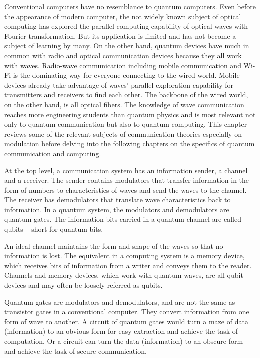 \documentclass{book}
\begin{document}
Conventional computers have no resemblance to quantum computers. Even before the appearance of modern computer, the not widely known subject of optical computing has explored the parallel computing capability of optical waves with Fourier transformation. But its application is limited and has not become a subject of learning by many. On the other hand, quantum devices have much in common with radio and optical communication devices because they all work with waves. Radio-wave communication including mobile communication and Wi-Fi is the dominating way for everyone connecting to the wired world. Mobile devices already take advantage of waves' parallel exploration capability for transmitters and receivers to find each other. The backbone of the wired world, on the other hand, is all optical fibers. The knowledge of wave communication reaches more engineering students than quantum physics and is most relevant not only to quantum communication but also to quantum computing. This chapter reviews some of the relevant subjects of communication theories especially on modulation before delving into the following chapters on the specifics of quantum communication and computing.

At the top level, a communication system has an information sender, a channel and a receiver. The sender contains modulators that transfer information in the form of numbers to characteristics of waves and send the waves to the channel. The receiver has demodulators that translate wave characteristics back to information. In a quantum system, the modulators and demodulators are quantum gates. The information bits carried in a quantum channel are called qubits -- short for quantum bits.

An ideal channel maintains the form and shape of the waves so that no information is lost. The equivalent in a computing system is a memory device, which receives bits of information from a writer and conveys them to the reader. Channels and memory devices, which work with quantum waves, are all qubit devices and may often be loosely referred as qubits.

Quantum gates are modulators and demodulators, and are not the same as transistor gates in a conventional computer. They convert information from one form of wave to another. A circuit of quantum gates would turn a maze of data (information) to an obvious form for easy extraction and achieve the task of computation. Or a circuit can turn the data (information) to an obscure form and achieve the task of secure communication.
\end{document}
